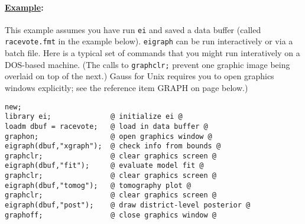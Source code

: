 \documentclass[11pt,titlepage]{article}
\begin{document}
\paragraph{\underline{Example}:}
This example assumes you have run \texttt{ei} and saved a data buffer
(called \texttt{racevote.fmt} in the example below).  \texttt{eigraph}
can be run interactively or via a batch file.  Here is a typical set
of commands that you might run interatively on a DOS-based machine.
(The calls to \texttt{graphclr;} prevent one graphic image being
overlaid on top of the next.)  Gauss for Unix requires you to open
graphics windows explicitly; see the reference item GRAPH on page
\pageref{graph} below.)
\begin{verbatim}
new;
library ei;              @ initialize ei @
loadm dbuf = racevote;   @ load in data buffer @
graphon;                 @ open graphics window @
eigraph(dbuf,"xgraph");  @ check info from bounds @
graphclr;                @ clear graphics screen @
eigraph(dbuf,"fit");     @ evaluate model fit @
graphclr;                @ clear graphics screen @
eigraph(dbuf,"tomog");   @ tomography plot @
graphclr;                @ clear graphics screen @
eigraph(dbuf,"post");    @ draw district-level posterior @
graphoff;                @ close graphics window @
\end{verbatim}
\end{document}

